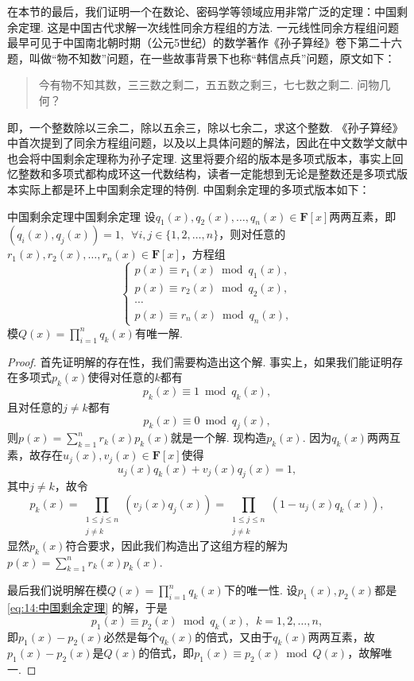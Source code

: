 在本节的最后，我们证明一个在数论、密码学等领域应用非常广泛的定理：中国剩余定理. 这是中国古代求解一次线性同余方程组的方法. 一元线性同余方程组问题最早可见于中国南北朝时期（公元5世纪）的数学著作《孙子算经》卷下第二十六题，叫做``物不知数''问题，在一些故事背景下也称``韩信点兵''问题，原文如下：
\begin{quote}
    \kaishu
    今有物不知其数，三三数之剩二，五五数之剩三，七七数之剩二. 问物几何？
\end{quote}
即，一个整数除以三余二，除以五余三，除以七余二，求这个整数. 《孙子算经》中首次提到了同余方程组问题，以及以上具体问题的解法，因此在中文数学文献中也会将中国剩余定理称为孙子定理. 这里将要介绍的版本是多项式版本，事实上回忆整数和多项式都构成环这一代数结构，读者一定能想到无论是整数还是多项式版本实际上都是环上中国剩余定理的特例. 中国剩余定理的多项式版本如下：
\begin{theorem}{中国剩余定理}{中国剩余定理}
    设$q_1(x),q_2(x),\ldots,q_n(x)\in\mathbf{F}[x]$两两互素，即$(q_i(x),q_j(x))=1,\enspace\forall i,j\in\{1,2,\ldots,n\}$，则对任意的$r_1(x),r_2(x),\ldots,r_n(x)\in\mathbf{F}[x]$，方程组
    \begin{equation} \label{eq:14:中国剩余定理}
        \begin{cases}
            p(x)\equiv r_1(x)\bmod{q_1(x)}, \\
            p(x)\equiv r_2(x)\bmod{q_2(x)}, \\
            \cdots                          \\
            p(x)\equiv r_n(x)\bmod{q_n(x)},
        \end{cases}
    \end{equation}
    模$Q(x)=\prod\limits_{i=1}^nq_k(x)$有唯一解.
\end{theorem}
\begin{proof}
    首先证明解的存在性，我们需要构造出这个解. 事实上，如果我们能证明存在多项式$p_k(x)$使得对任意的$k$都有
    \[p_k(x)\equiv 1\bmod{q_k(x)},\]
    且对任意的$j\neq k$都有
    \[p_k(x)\equiv 0\bmod{q_j(x)},\]
    则$p(x)=\sum\limits_{k=1}^nr_k(x)p_k(x)$就是一个解. 现构造$p_k(x)$. 因为$q_k(x)$两两互素，故存在$u_j(x),v_j(x)\in\mathbf{F}[x]$使得
    \[u_j(x)q_k(x)+v_j(x)q_j(x)=1,\]
    其中$j\neq k$，故令
    \[
    p_k(x) =\prod_{\substack{1 \leqslant j \leqslant n \\ j \neq k}}(v_j(x)q_j(x))=\prod_{\substack{1 \leqslant j \leqslant n \\ j \neq k}}(1-u_j(x)q_k(x)),
    \]
    显然$p_k(x)$符合要求，因此我们构造出了这组方程的解为$p(x)=\sum\limits_{k=1}^nr_k(x)p_k(x)$.

    最后我们说明解在模$Q(x)=\prod\limits_{i=1}^nq_k(x)$下的唯一性. 设$p_1(x),p_2(x)$都是\autoref{eq:14:中国剩余定理} 的解，于是
    \[p_1(x)\equiv p_2(x)\bmod{q_k(x)},\enspace k=1,2,\ldots,n,\]
    即$p_1(x)-p_2(x)$必然是每个$q_k(x)$的倍式，又由于$q_k(x)$两两互素，故$p_1(x)-p_2(x)$是$Q(x)$的倍式，即$p_1(x)\equiv p_2(x)\bmod{Q(x)}$，故解唯一.
\end{proof}

